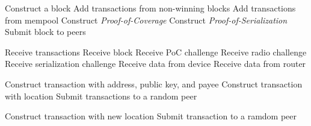 \documentclass[UTF8, 10pt, nonatbib, nocopyrightspace, reprint]{sigplanconf}
\newenvironment{protocol}[2]{
  \begin{algorithm}[!htb]
    \DontPrintSemicolon
    \caption{#1}\label{#2}
}{
  \end{algorithm}
  \FloatBarrier
}
\begin{document}
\begin{protocol}{Miner Protocol Overview}{proto:miner}

   {
    Construct a block\;
    Add transactions from non-winning blocks\;
    Add transactions from mempool\;
    Construct \emph{Proof-of-Coverage}\;
    Construct \emph{Proof-of-Serialization}\;
    Submit block to peers\;
  }

   {
    Receive transactions\;
    Receive block\;
    Receive PoC challenge\;
    Receive radio challenge\;
    Receive serialization challenge\;
    Receive data from device\;
    Receive data from router\;
  }

   {
    Construct transaction with address, public key, and payee\;
    Construct transaction with location\;
    Submit transactions to a random peer\;
  }

   {
    Construct transaction with new location\;
    Submit transaction to a ramdom peer\;
  }
\end{protocol}
\end{document}
